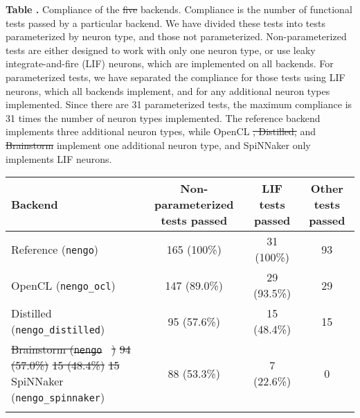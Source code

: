 \documentclass{frontiersSCNS}
\providecommand{\DIFadd}[1]{{\protect\color{blue}\uwave{#1}}} %
\providecommand{\DIFdel}[1]{{\protect\color{red}\sout{#1}}}                      %
\providecommand{\DIFaddFL}[1]{\DIFadd{#1}} %
\providecommand{\DIFdelFL}[1]{\DIFdel{#1}} %
\providecommand{\DIFaddbeginFL}{} %
\providecommand{\DIFaddendFL}{} %
\providecommand{\DIFdelbeginFL}{} %
\providecommand{\DIFdelendFL}{} %
\begin{document}
\begin{table}[!ht]
\textbf{\label{Tab:02} Table .}{
  Compliance of the \DIFdelbeginFL \DIFdelFL{five }\DIFdelendFL \DIFaddbeginFL \DIFaddFL{four }\DIFaddendFL backends. Compliance is the number of functional
  tests passed by a particular backend. We have divided these tests into
  tests parameterized by neuron type, and those not parameterized.
  Non-parameterized tests are either designed to work with only
  one neuron type, or use leaky integrate-and-fire (LIF) neurons,
  which are implemented on all backends. For parameterized tests,
  we have separated the compliance for those tests using LIF neurons,
  which all backends implement, and for any additional neuron types
  implemented. Since there are 31 parameterized tests, the maximum
  compliance is 31 times the number of neuron types implemented.
  The reference backend implements three additional neuron types,
  while OpenCL \DIFdelbeginFL \DIFdelFL{, Distilled, }\DIFdelendFL and \DIFdelbeginFL \DIFdelFL{Brainstorm }\DIFdelendFL \DIFaddbeginFL \DIFaddFL{distilled }\DIFaddendFL implement one additional neuron type,
  and SpiNNaker only implements LIF neurons.}

\processtable{ }
{\begin{tabular}{lccc}\toprule
 Backend & Non-parameterized tests passed & LIF tests passed & Other tests passed \\ \midrule
 Reference (\texttt{nengo}) & 165 (100\%) & 31 (100\%) & 93 \\
 OpenCL (\texttt{nengo\_ocl}) & 147 (89.0\%) & 29 (93.5\%) & 29 \\
 Distilled (\texttt{nengo\_distilled}) & 95 (57.6\%) & 15 (48.4\%) & 15 \\
 \DIFdelbeginFL \DIFdelFL{Brainstorm (}\texttt{\DIFdelFL{nengo}%
}%
\DIFdelFL{) }%
\DIFdelFL{94 (57.0\%) }%
\DIFdelFL{15 (48.4\%) }%
\DIFdelFL{15 }%
\DIFdelendFL SpiNNaker (\texttt{nengo\_spinnaker}) & 88 (53.3\%) & 7 (22.6\%) & 0 \\\botrule
\end{tabular}}{}
\end{table}
\end{document}
